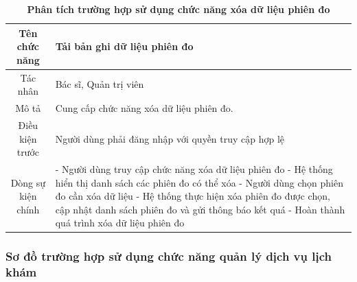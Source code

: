 \begin{table}[H]
	\caption{\bfseries \fontsize{12pt}{0pt}\selectfont Phân tích trường hợp sử dụng chức năng xóa dữ liệu phiên đo}
	\centering
	\begin{tabularx}{0.9\textwidth}{|c|X|}
		\hline
		\textbf{Tên chức năng} & \textbf{Tải bản ghi dữ liệu phiên đo}                                                                                                                                                 \\
		\hline
		Tác nhân               & Bác sĩ, Quản trị viên                                                                                                                                                                 \\
		\hline
		Mô tả                  & Cung cấp chức năng xóa dữ liệu phiên đo. \\
		\hline
		Điều kiện trước        & Người dùng phải đăng nhập với quyền truy cập hợp lệ                                                                                                                                   \\
		\hline
		Dòng sự kiện chính     &
		- Người dùng truy cập chức năng xóa dữ liệu phiên đo \newline
		- Hệ thống hiển thị danh sách các phiên đo có thể xóa \newline
		- Người dùng chọn phiên đo cần xóa dữ liệu \newline
		- Hệ thống thực hiện xóa phiên đo được chọn, cập nhật danh sách phiên đo và gửi thông báo kết quá \newline
		- Hoàn thành quá trình xóa dữ liệu phiên đo                                                                                                                                   \\
		\hline
	\end{tabularx}
\end{table}

\subsubsection{Sơ đồ trường hợp sử dụng chức năng quản lý dịch vụ lịch khám}

